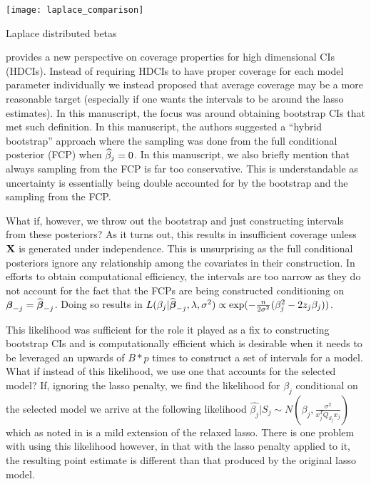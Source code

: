 \begin{table}[hbtp]
    \centering
    \texttt{[image: laplace\_comparison]}
    \caption{\label{Fig:laplace_comparison} Laplace distributed betas}
\end{table}
    

 provides a new perspective on coverage properties for high dimensional CIs (HDCIs). Instead of requiring HDCIs to have proper coverage for each model parameter individually we instead proposed that average coverage may be a more reasonable target (especially if one wants the intervals to be around the lasso estimates). In this manuscript, the focus was around obtaining bootstrap CIs that met such definition. In this manuscript, the authors suggested a ``hybrid bootstrap'' approach where the sampling was done from the full conditional posterior (FCP) when $\widehat{\beta}_j = 0$. In this manuscript, we also briefly mention that always sampling from the FCP is far too conservative. This is understandable as uncertainty is essentially being double accounted for by the bootstrap and the sampling from the FCP. 

What if, however, we throw out the bootstrap and just constructing intervals from these posteriors? As it turns out, this results in insufficient coverage unless $\mathbf{X}$ is generated under independence. This is unsurprising as the full conditional posteriors ignore any relationship among the covariates in their construction. In efforts to obtain computational efficiency, the intervals are too narrow as they do not account for the fact that the FCPs are being constructed conditioning on $\boldsymbol{\beta}_{-j} = \widehat{\boldsymbol{\beta}}_{-j}$. Doing so results in $L(\beta_j|\widehat{\boldsymbol{\beta}}_{-j}, \lambda, \sigma^2) \propto \exp(-\frac{n}{2\sigma^2}(\beta_{j}^2 - 2 z_{j} \beta_{j}))$.

This likelihood was sufficient for the role it played as a fix to constructing bootstrap CIs and is computationally efficient which is desirable when it needs to be leveraged an upwards of $B*p$ times to construct a set of intervals for a model. What if instead of this likelihood, we use one that accounts for the selected model? If, ignoring the lasso penalty, we find the likelihood for $\beta_j$ conditional on the selected model we arrive at the following likelihood $\hat{\beta_j} | S_j \sim N(\beta_j, \frac{\sigma^2}{x_j^T Q_{S_j} x_j})$ which as noted in  is a mild extension of the relaxed lasso. There is one problem with using this likelihood however, in that with the lasso penalty applied to it, the resulting point estimate is different than that produced by the original lasso model. 

